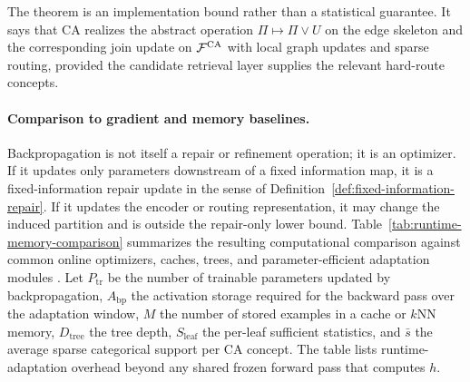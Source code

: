The theorem is an implementation bound rather than a statistical guarantee. It says that CA realizes the abstract operation $\Pi\mapsto\Pi\vee U$ on the edge skeleton and the corresponding join update on $\mathcal{F}^{\mathrm{CA}}$ with local graph updates and sparse routing, provided the candidate retrieval layer supplies the relevant hard-route concepts.

\paragraph{Comparison to gradient and memory baselines.}
Backpropagation is not itself a repair or refinement operation; it is an optimizer. If it updates only parameters downstream of a fixed information map, it is a fixed-information repair update in the sense of Definition~\ref{def:fixed-information-repair}. If it updates the encoder or routing representation, it may change the induced partition and is outside the repair-only lower bound. Table~\ref{tab:runtime-memory-comparison} summarizes the resulting computational comparison against common online optimizers, caches, trees, and parameter-efficient adaptation modules \citep{rumelhart1986learning,kingma2015adam,grave2017improving,khandelwal2020generalization,domingos2000mining,houlsby2019parameter,hu2022lora}. Let $P_{\mathrm{tr}}$ be the number of trainable parameters updated by backpropagation, $A_{\mathrm{bp}}$ the activation storage required for the backward pass over the adaptation window, $M$ the number of stored examples in a cache or $k$NN memory, $D_{\mathrm{tree}}$ the tree depth, $S_{\mathrm{leaf}}$ the per-leaf sufficient statistics, and $\bar s$ the average sparse categorical support per CA concept. The table lists runtime-adaptation overhead beyond any shared frozen forward pass that computes $h$.

